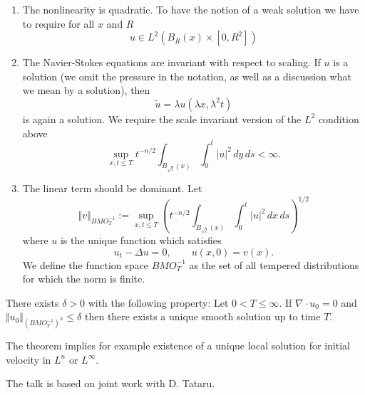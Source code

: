 \documentclass[a4paper,12pt]{amsart}
\begin{document}
\begin{enumerate}

\item The nonlinearity is quadratic. To have the notion of a  weak solution 
we have to require for all $x$ and $R$
\begin{equation} \label{1}   u \in L^2(B_R(x)\times [0,R^2]) \end{equation}


\item The Navier-Stokes equations are invariant with respect to
scaling. If  $u$ is a solution (we omit the pressure in the notation,
as well as a discussion what we mean by a solution), then 
\[ \tilde u= \lambda u(\lambda x, \lambda^2 t) \]
is  again a solution. We require the   scale invariant version of 
the $L^2$ condition above
\begin{equation}\label{2}  
\sup_{x,t\le T} t^{-n/2} \int_{B_{\sqrt{t}}(x)} \int_0^{t} |u|^2 \, dy \, ds < \infty. 
\end{equation} 

\item  
The linear term should be  dominant. Let 
\begin{equation}  \Vert v \Vert_{BMO^{-1}_{T}} := \sup_{x,t\le T } \left( t^{-n/2}\int_{B_{\sqrt{t}}(x)}
\int_0^{t} |u|^2 \, dx \, ds \right)^{1/2} \end{equation} 
where $u$ is the unique function  which satisfies 
\[ u_t - \Delta u = 0, \qquad u(x,0)= v(x). \]
We define the function space $BMO^{-1}_T $ as the set of all tempered distributions for which the norm is finite.

\end{enumerate}



\begin{theorem} 
There exists $\delta>0$ with the following property: Let $0<T\le \infty$. 
If $\nabla \cdot u_0=0$ and 
$ \Vert u_0 \Vert_{(BMO^{-1}_{T})^n}
 \le \delta $ 
then there exists a unique smooth solution up to time $T$.
\end{theorem}

The theorem  implies for example existence of a unique local solution for initial velocity in $L^n$ or $L^\infty$.

The talk is based on joint work with D. Tataru. 





\end{document}
